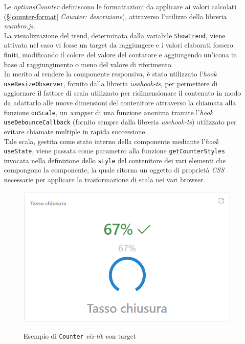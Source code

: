 Le \textit{optionsCounter} definiscono le formattazioni da applicare ai valori calcolati (\S \ref{counter-format} \textit{Counter: descrizione}), attraverso l'utilizzo della libreria \textit{numbro.js}. \\
La visualizzazione del trend, determinata dalla variabile \texttt{ShowTrend}, viene attivata nel caso vi fosse un target da raggiungere e i valori elaborati
fossero finiti, modificando il colore del valore del contatore e aggiungendo un'icona in base al raggiungimento o meno del valore di riferimento. \\
In merito al rendere la componente responsiva, è stato utilizzato l'\textit{hook} \\
\texttt{useResizeObserver}, fornito dalla libreria \textit{usehook-ts}, per permettere di
aggiornare il fattore di scala utilizzato per ridimensionare il contenuto in modo da adattarlo alle nuove dimensioni del contenitore attraverso la chiamata alla funzione \texttt{onScale},
un \textit{wrapper} di una funzione anonima tramite l'\textit{hook} \texttt{useDebounceCallback} (fornito sempre dalla libreria \textit{usehook-ts}) utilizzato per evitare chiamate multiple in rapida successione. \\
Tale scala, gestita come stato interno della componente mediante l'\textit{hook} \texttt{useState}, viene passata come parametro alla funzione \texttt{getCounterStyles} invocata nella definizione
dello \texttt{style} del contenitore dei vari elementi che compongono la componente, la quale ritorna un oggetto di proprietà \textit{CSS} necessarie per applicare la trasformazione di scala nei
vari browser.

\begin{figure}[H]
    \centering
    \includegraphics[alt={Esempio di Counter viz-lib con target}, width=0.5 \columnwidth, height=\maxdimen, keepaspectratio]{img/ex_counter.png}
    \caption{Esempio di \texttt{Counter} \textit{viz-lib} con target}
    \label{fig:counter-example}
\end{figure}


